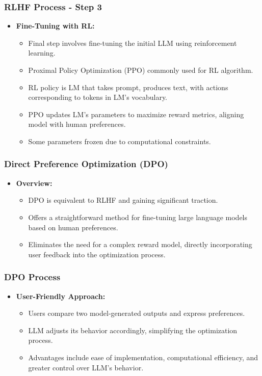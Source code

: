 \begin{frame}[fragile]\frametitle{RLHF Process - Step 3}
  \begin{itemize}
    \item \textbf{Fine-Tuning with RL:}
      \begin{itemize}
        \item Final step involves fine-tuning the initial LLM using reinforcement learning.
        \item Proximal Policy Optimization (PPO) commonly used for RL algorithm.
        \item RL policy is LM that takes prompt, produces text, with actions corresponding to tokens in LM's vocabulary.
        \item PPO updates LM's parameters to maximize reward metrics, aligning model with human preferences.
        \item Some parameters frozen due to computational constraints.
      \end{itemize}
  \end{itemize}
\end{frame}

\begin{frame}[fragile]\frametitle{Direct Preference Optimization (DPO)}
  \begin{itemize}
    \item \textbf{Overview:}
      \begin{itemize}
        \item DPO is equivalent to RLHF and gaining significant traction.
        \item Offers a straightforward method for fine-tuning large language models based on human preferences.
        \item Eliminates the need for a complex reward model, directly incorporating user feedback into the optimization process.
      \end{itemize}
  \end{itemize}
\end{frame}

\begin{frame}[fragile]\frametitle{DPO Process}
  \begin{itemize}
    \item \textbf{User-Friendly Approach:}
      \begin{itemize}
        \item Users compare two model-generated outputs and express preferences.
        \item LLM adjusts its behavior accordingly, simplifying the optimization process.
        \item Advantages include ease of implementation, computational efficiency, and greater control over LLM's behavior.
      \end{itemize}
  \end{itemize}
\end{frame}

